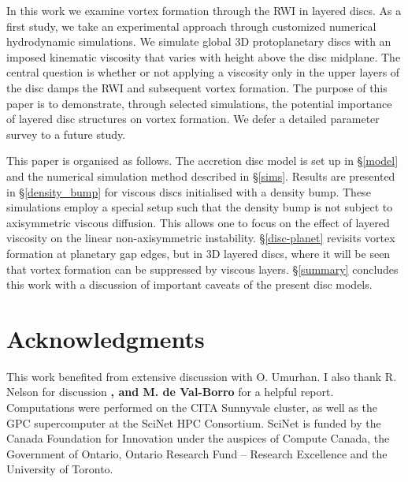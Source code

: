 \documentclass[useAMS,usenatbib]{mn2e}
\begin{document}
In this work we examine vortex formation through the RWI in
layered discs. As a first study, we take an
experimental approach through customized numerical hydrodynamic
simulations. We simulate global 3D protoplanetary discs with an imposed
kinematic viscosity that varies with height above the disc
midplane. %
The central question is whether or not applying a viscosity only in the upper
layers of the disc damps the RWI and subsequent vortex formation.   
The purpose of this paper is to demonstrate, through selected 
simulations, the potential importance of layered disc structures on
vortex formation. We defer a detailed parameter survey to a future
study.  

 
This paper is organised as follows. The accretion disc model is 
set up in \S\ref{model} and the numerical simulation method described
in \S\ref{sims}. Results are presented in \S\ref{density_bump} for 
viscous discs initialised with a density bump. These 
simulations employ a special setup such that the density bump is not
subject to axisymmetric viscous diffusion. This allows one to
focus on the effect of layered viscosity on the linear
non-axisymmetric instability. \S\ref{disc-planet} revisits vortex
formation at planetary gap edges, but in 3D layered discs, 
where it will be seen that vortex formation can be suppressed by
viscous layers. \S\ref{summary} concludes this work with a discussion
of important caveats of the present disc models.   







\section*{Acknowledgments}
This work benefited from extensive discussion with O. Umurhan. I also
thank R. Nelson for discussion {\bf, and M. de Val-Borro} for a
helpful report.   Computations were performed on the
CITA Sunnyvale cluster, as well as the GPC supercomputer at the SciNet
HPC Consortium. SciNet is funded by the Canada Foundation for
Innovation under the auspices of Compute Canada, the Government of
Ontario, Ontario Research Fund – Research Excellence and the
University of Toronto.   




\appendix

%
\end{document}
